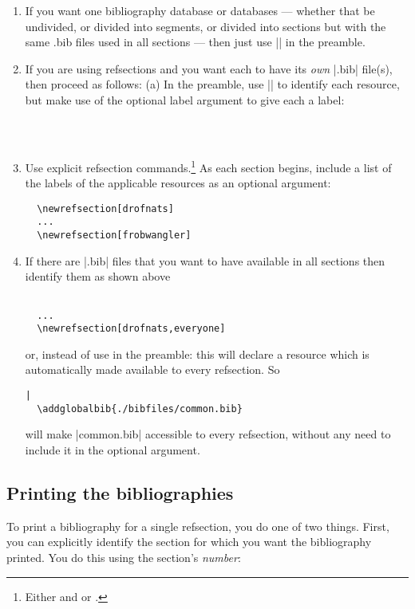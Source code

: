 \begin{enumerate}
\item If you want one bibliography database or databases --- whether
  that be undivided, or divided into segments, or divided into
  sections but with the same .bib files used in all sections --- then
  just use || in the preamble.
\item If you are using refsections and you want each to have its
  \emph{own} |.bib| file(s), then proceed as follows: (a) In the
  preamble, use || to identify each resource, but
  make use of the optional label argument to give each a label:
\begin{Verbatim}
  
  
\end{Verbatim}
\item Use explicit refsection commands.\footnote{Either
     and  or
    .} As each section begins, include a list of the
  labels of the applicable resources as an optional argument:
\begin{Verbatim}
  \newrefsection[drofnats]
  ... 
  \newrefsection[frobwangler]
\end{Verbatim}
\item If there are |.bib| files that you want to have available in all
  sections then identify them as shown above
\begin{Verbatim}
  
  ...
  \newrefsection[drofnats,everyone]
\end{Verbatim}
or, instead of  use
 in the preamble: this will
declare a resource which is automatically made available to every
refsection. So
\begin{Verbatim}|
  \addglobalbib{./bibfiles/common.bib}
\end{Verbatim} 
will make |common.bib| accessible to every refsection, without any
need to include it in the optional argument.
\end{enumerate}
\subsection{Printing the bibliographies}

To print a bibliography for a single refsection, you do one of two
things. First, you can explicitly identify the section for which you
want the bibliography printed. You do this using the section's
\emph{number}:

